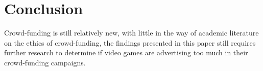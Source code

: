 \documentclass{scrartcl}
\begin{document}
\section{Conclusion}

Crowd-funding is still relatively new, with little in the way of academic literature on the ethics of crowd-funding, the findings presented in this paper still requires further research to determine if video games are advertising too much in their crowd-funding campaigns.




\end{document}
